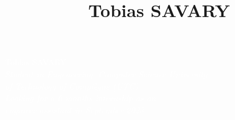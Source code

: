 \documentclass[9pt, oneside, a4paper, titlepage]{extarticle}
\title{Tobias SAVARY}
\date{}
\begin{document}
    \begin{tcolorbox}
        \begin{minipage}{0.3\linewidth}
            \hspace*{1cm} %
        \end{minipage}%
        \hspace{1cm}%
        \begin{minipage}{0.5\linewidth}
            \begin{center}
                \Huge{\textcolor{white}{Tobias SAVARY}} \\
                \vspace*{0.5cm}
                \Large{\textcolor{white}{\emph{Student in Engeneering, Computer Science  University \\of Technology of Compiègne (UTC) \\}}}
                \vspace*{0.5cm}
                \Large{\textcolor{white}{\emph{Looking for a 6 months internship as an \\engineer assistant in September 2023
                }}}
            \end{center}
        \end{minipage}%
    \end{tcolorbox}
\end{document}
